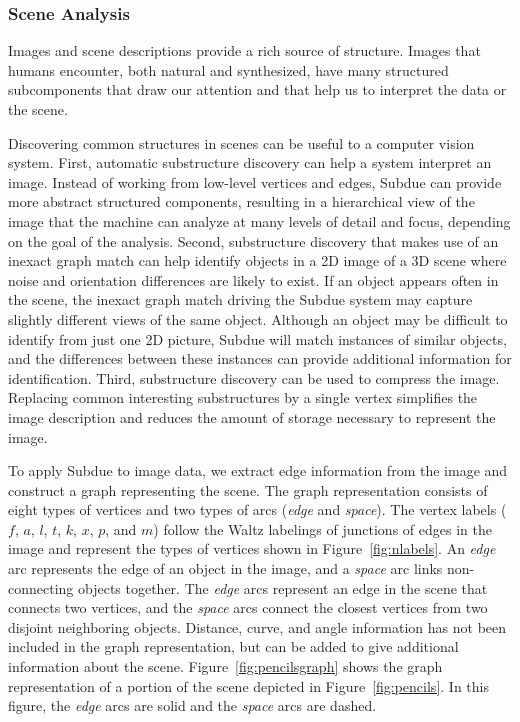 


\subsubsection{Scene Analysis}


Images and scene descriptions
provide a rich source of structure.  Images that humans
encounter, both natural and synthesized, have many structured subcomponents
that draw our attention and that help us to interpret the data or the scene.

Discovering common structures in scenes can be useful to a computer vision
system.  First, automatic substructure discovery can help a system interpret an
image.  Instead of working from low-level vertices and edges, {\sc Subdue} can
provide more abstract structured components, resulting in a hierarchical view
of the image that the machine can analyze at many levels of detail and focus,
depending on the goal of the analysis.  Second, substructure discovery that
makes use of an inexact graph match can help identify objects in a 2D image
of a 3D scene where noise and orientation differences are likely to exist.
If an object appears often in the scene, the inexact graph match driving the
{\sc Subdue} system may capture slightly different views of the same object.
Although an object may be difficult to identify from just one 2D picture,
{\sc Subdue} will match instances of similar objects, and the differences
between these instances can provide additional information for identification.
Third, substructure discovery can be used to compress the image.  Replacing
common interesting substructures by a single vertex simplifies the image
description and reduces the amount of storage necessary to represent the image.

To apply {\sc Subdue} to image data, we extract edge information from the
image and construct a graph representing the scene.  The graph representation
consists of eight types of vertices and two types of arcs ({\em edge} and
{\em space}).
The vertex labels ($f$, $a$, $l$, $t$, $k$, $x$, $p$, and $m$) follow the Waltz
labelings \cite{W75} of junctions of edges in the image and represent the
types of vertices shown in Figure~\ref{fig:nlabels}.
An {\em edge} arc represents the edge of an object in the image, and a
{\em space} arc links non-connecting objects together.
The {\em edge} arcs represent
an edge in the scene that connects two vertices, and the {\em space} arcs
connect the closest vertices from two disjoint neighboring objects.
Distance, curve, and angle
information has not been included in the graph representation, but can be added
to give additional information about the scene.  Figure~\ref{fig:pencilsgraph}
shows the graph representation of a portion of the scene depicted
in Figure~\ref{fig:pencils}.  In this figure, the {\em edge} arcs are solid
and the {\em space} arcs are dashed.

